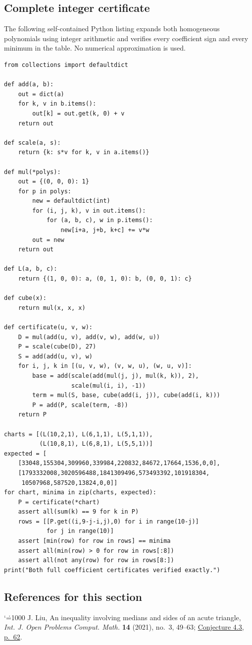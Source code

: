 \documentclass[11pt,a4paper]{article}
\makeatletter
\numberwithin{equation}{section}
\theoremstyle{definition}
\theoremstyle{remark}
\renewenvironment{thebibliography}[1]
 {\subsection*{References for this section}\small
  \list{\@biblabel{\@arabic\c@enumiv}}
       {\settowidth\labelwidth{\@biblabel{#1}}\leftmargin\labelwidth
        \advance\leftmargin\labelsep\@openbib@code
        \usecounter{enumiv}\let\p@enumiv\@empty
        \renewcommand\theenumiv{\@arabic\c@enumiv}}
  \sloppy\clubpenalty4000\widowpenalty4000\sfcode`\.=1000\relax}
 {\def\@noitemerr{\@latex@warning{Empty bibliography}}\endlist}
\makeatother
\begin{document}
\subsection*{Complete integer certificate}
The following self-contained Python listing expands both homogeneous
polynomials using integer arithmetic and verifies every coefficient sign
and every minimum in the table. No numerical approximation is used.
\begingroup\scriptsize
\begin{Verbatim}
from collections import defaultdict

def add(a, b):
    out = dict(a)
    for k, v in b.items():
        out[k] = out.get(k, 0) + v
    return out

def scale(a, s):
    return {k: s*v for k, v in a.items()}

def mul(*polys):
    out = {(0, 0, 0): 1}
    for p in polys:
        new = defaultdict(int)
        for (i, j, k), v in out.items():
            for (a, b, c), w in p.items():
                new[i+a, j+b, k+c] += v*w
        out = new
    return out

def L(a, b, c):
    return {(1, 0, 0): a, (0, 1, 0): b, (0, 0, 1): c}

def cube(x):
    return mul(x, x, x)

def certificate(u, v, w):
    D = mul(add(u, v), add(v, w), add(w, u))
    P = scale(cube(D), 27)
    S = add(add(u, v), w)
    for i, j, k in [(u, v, w), (v, w, u), (w, u, v)]:
        base = add(scale(add(mul(j, j), mul(k, k)), 2),
                   scale(mul(i, i), -1))
        term = mul(S, base, cube(add(i, j)), cube(add(i, k)))
        P = add(P, scale(term, -8))
    return P

charts = [(L(10,2,1), L(6,1,1), L(5,1,1)),
          (L(10,8,1), L(6,8,1), L(5,5,1))]
expected = [
    [33048,155304,309960,339984,220832,84672,17664,1536,0,0],
    [1793332008,3020596488,1841309496,573493392,101918304,
     10507968,587520,13824,0,0]]
for chart, minima in zip(charts, expected):
    P = certificate(*chart)
    assert all(sum(k) == 9 for k in P)
    rows = [[P.get((i,9-j-i,j),0) for i in range(10-j)]
            for j in range(10)]
    assert [min(row) for row in rows] == minima
    assert all(min(row) > 0 for row in rows[:8])
    assert all(not any(row) for row in rows[8:])
print("Both full coefficient certificates verified exactly.")
\end{Verbatim}

\endgroup

\begin{thebibliography}{1}
 J. Liu, An inequality involving medians and sides of an acute triangle, \emph{Int. J. Open Problems Comput. Math.} \textbf{14} (2021), no.~3, 49--63; \href{https://www.ijopcm.org/Vol/2021/3.5.pdf}{Conjecture 4.3, p.~62}.
\end{thebibliography}
\end{document}
